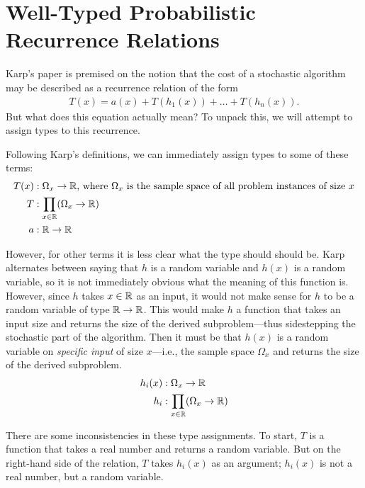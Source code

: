 \chapter{Well-Typed Probabilistic Recurrence Relations}
Karp's paper is premised on the notion that the cost of a stochastic algorithm may be described as a
recurrence relation of the form
\begin{align*}
T(x) = a(x) + T(h_1(x)) + \dots + T(h_n(x)).
\end{align*}
But what does this equation actually mean? To unpack this, we will attempt to assign types to this recurrence.

 Following Karp's definitions, we can immediately assign types to some of these terms:
\begin{align*}
T(x) &: \Omega_x \rightarrow \mathbb{R} \text{, where } \Omega_x \text{ is the sample space of all problem instances of size } x \\
T &: \prod_{x \in \mathbb{R}} (\Omega_x \rightarrow \mathbb{R}) \\ 
a &: \mathbb{R} \rightarrow \mathbb{R}
\end{align*}

However, for other terms it is less clear what the type should should be. Karp alternates between saying that $h$ is a random 
variable and $h(x)$ is a random variable, so it is not immediately obvious 
what the meaning of this function is. However, since $h$ takes $x \in \mathbb{R}$ as an input, it would not make sense for $h$ to be a 
random variable of type $\mathbb{R} \rightarrow \mathbb{R}$. This would make $h$ a function that takes an input size and returns the 
size of the derived subproblem---thus sidestepping the stochastic part of the algorithm. Then it must be that $h(x)$ is a 
random variable on \emph{specific input} of size $x$---i.e., the sample space $\Omega_x$ and returns the size of the derived 
subproblem.
\begin{align*}
h_i(x) &: \Omega_x \rightarrow \mathbb{R} \\
h_i &: \prod_{x \in \mathbb{R}}(\Omega_x \rightarrow \mathbb{R}) 
\end{align*} 

There are some inconsistencies in these type assignments. To start, $T$ is a function that takes a real number and 
returns a random variable. But on the right-hand side of the relation, $T$ takes $h_i(x)$ as an argument; $h_i(x)$ is
not a real number, but a random variable. 

